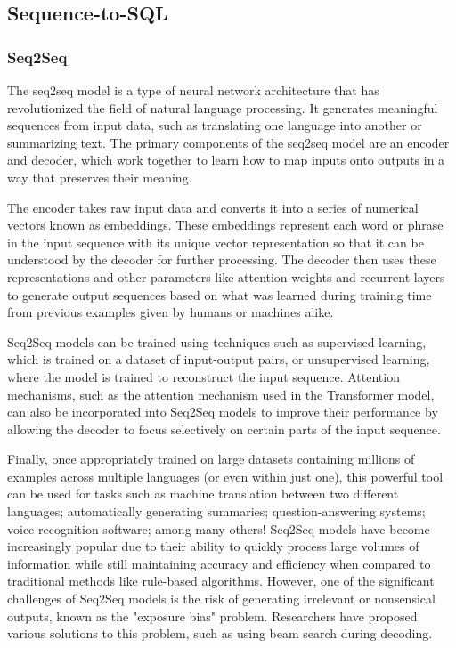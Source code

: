 \subsection{Sequence-to-SQL}

\subsubsection{Seq2Seq}

The seq2seq model\cite{DBLP:journals/corr/SutskeverVL14} is a type of neural network architecture that has revolutionized the field of natural language processing. It generates meaningful sequences from input data, such as translating one language into another or summarizing text. The primary components of the seq2seq model are an encoder and decoder, which work together to learn how to map inputs onto outputs in a way that preserves their meaning.

The encoder takes raw input data and converts it into a series of numerical vectors known as embeddings. These embeddings represent each word or phrase in the input sequence with its unique vector representation so that it can be understood by the decoder for further processing. The decoder then uses these representations and other parameters like attention weights and recurrent layers to generate output sequences based on what was learned during training time from previous examples given by humans or machines alike.

Seq2Seq models can be trained using techniques such as supervised learning, which is trained on a dataset of input-output pairs, or unsupervised learning, where the model is trained to reconstruct the input sequence. Attention mechanisms, such as the attention mechanism used in the Transformer model, can also be incorporated into Seq2Seq models to improve their performance by allowing the decoder to focus selectively on certain parts of the input sequence.

Finally, once appropriately trained on large datasets containing millions of examples across multiple languages (or even within just one), this powerful tool can be used for tasks such as machine translation between two different languages; automatically generating summaries; question-answering systems; voice recognition software; among many others! Seq2Seq models have become increasingly popular due to their ability to quickly process large volumes of information while still maintaining accuracy and efficiency when compared to traditional methods like rule-based algorithms. However, one of the significant challenges of Seq2Seq models is the risk of generating irrelevant or nonsensical outputs, known as the "exposure bias" problem. Researchers have proposed various solutions to this problem, such as using beam search during decoding.

